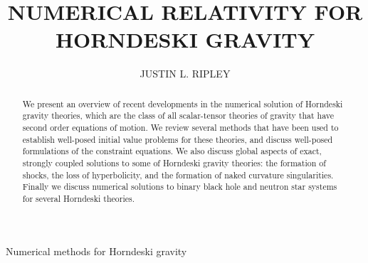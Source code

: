 \documentclass{ws-ijmpd}
\begin{document}
{Numerical methods for Horndeski gravity}

%
\catchline{}{}{}{}{}
%

\title{NUMERICAL RELATIVITY FOR HORNDESKI GRAVITY}

\author{JUSTIN L. RIPLEY}

\address{Department of Applied Mathematics and Theoretical Physics, \\
University of Cambridge, Cambridge, CB3 0WA,
United Kingdom
\\
\;
\\
Illinois Center for Advanced Studies of the Universe \& Department of Physics,
University of Illinois at Urbana-Champaign, Urbana, Illinois 61801, USA
\\
\;
\\
ripley@illinois.edu}

\maketitle

\begin{history}
\end{history}

\begin{abstract}
   We present an overview of recent developments in the numerical solution
   of Horndeski gravity theories, which are the class of all scalar-tensor
   theories of gravity that have second order equations of motion.
   We review several methods that have been used to establish
   well-posed initial value problems for these theories,
   and discuss well-posed formulations of the constraint equations.
   We also discuss global aspects of exact, strongly coupled solutions to 
   some of Horndeski gravity theories: 
   the formation of shocks, the loss of hyperbolicity, 
   and the formation of naked curvature singularities.
   Finally we discuss numerical solutions to binary black hole and
   neutron star systems for several Horndeski theories.
\end{abstract}



\tableofcontents

\end{document}
